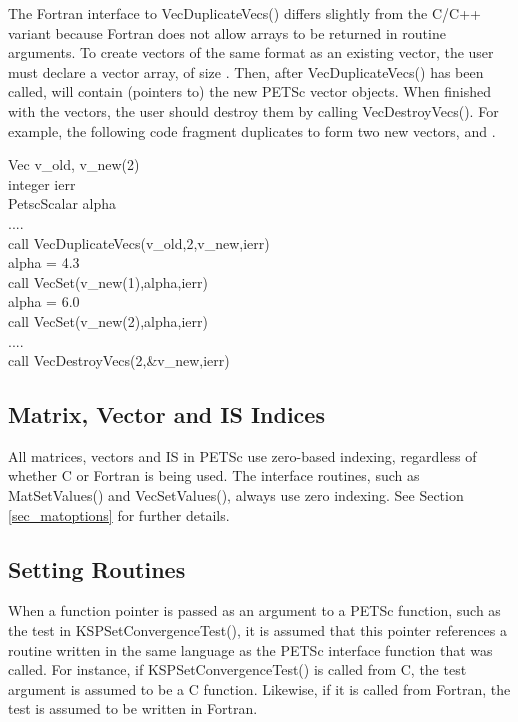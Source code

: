 The Fortran interface to VecDuplicateVecs() differs slightly
from the C/C++ variant because Fortran does not allow arrays to be
returned in routine arguments.  To create  vectors of the same
format as an existing vector, the user must declare a vector array,
 of size .  Then, after VecDuplicateVecs() has
been called,  will contain (pointers to) the new PETSc
vector objects.  When finished with the vectors, the user should
destroy them by calling VecDestroyVecs().
For example, the following code fragment
duplicates  to form two new vectors,  and .
\begin{tabbing}
   Vec     v\_old, v\_new(2)\\
   integer ierr\\
   PetscScalar  alpha\\
   ....\\
   call VecDuplicateVecs(v\_old,2,v\_new,ierr)\\
   alpha = 4.3\\
   call VecSet(v\_new(1),alpha,ierr)\\
   alpha = 6.0\\
   call VecSet(v\_new(2),alpha,ierr)\\
   ....\\
   call VecDestroyVecs(2,\&v\_new,ierr)
\end{tabbing}

\subsection{Matrix, Vector and IS Indices}

All matrices, vectors and IS in PETSc use zero-based indexing, regardless
of whether C or Fortran is being used.  The interface routines, such
as MatSetValues() and VecSetValues(), always use zero
indexing.  See Section \ref{sec_matoptions} for further details.

\subsection{Setting Routines}

When a function pointer is passed as an argument to a PETSc function, such as
the test in KSPSetConvergenceTest(), it is assumed that this pointer references
a routine written in the same language as the PETSc interface function that was
called. For instance, if KSPSetConvergenceTest() is called from C, the test
argument is assumed to be a C function. Likewise, if it is called from Fortran,
the test is assumed to be written in Fortran.

